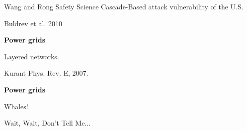   Wang and Rong
  Safety Science
  Cascade-Based  attack vulnerability of the U.S.

  Buldrev et al. 2010


  \textbf{Power grids}

  Layered networks.

  Kurant
  Phys. Rev. E, 2007.



  \textbf{Power grids}

  Whales!

  Wait, Wait, Don't Tell Me...


